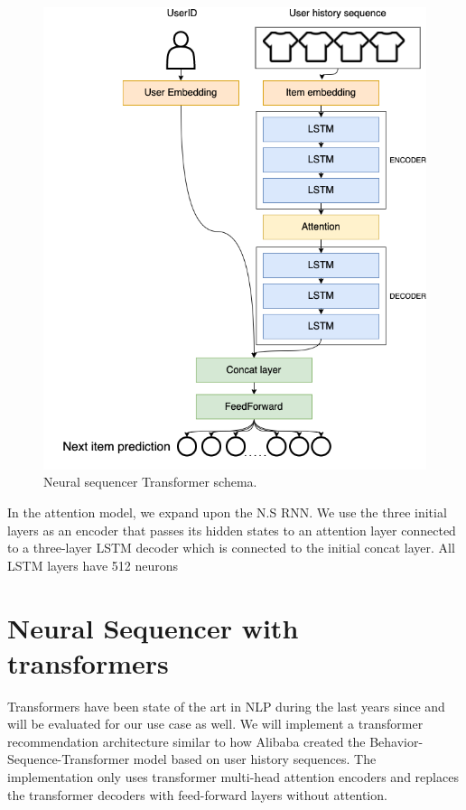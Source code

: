 \documentclass{tex_files/kththesis}
\begin{document}
\begin{figure}[H]
    \centering
    \includegraphics[scale=0.45]{images/models/Attention.png}
    \caption{Neural sequencer Transformer schema.}
\end{figure}

In the attention model, we expand upon the N.S RNN. We use the three initial layers as an encoder that passes its hidden states to an attention layer connected to a three-layer LSTM decoder which is connected to the initial concat layer. All LSTM layers have 512 neurons

\section{Neural Sequencer with transformers}
Transformers have been state of the art in NLP during the last years since \cite{attentionisallyouneed} and will be evaluated for our use case as well. We will implement a transformer recommendation architecture similar to how Alibaba created the Behavior-Sequence-Transformer model \cite{alibaba} based on user history sequences. The implementation only uses transformer multi-head attention encoders and replaces the transformer decoders with feed-forward layers without attention.
\end{document}
